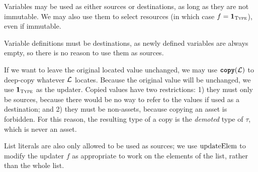 \documentclass[nonacm, dvipsnames, sigconf]{acmart}
\begin{document}
Variables may be used as either sources or destinations, as long as they are not immutable.
We may also use them to select resources (in which case $f = \id{\types}$), even if immutable.
\begin{mathpar}
\end{mathpar}

Variable definitions must be destinations, as newly defined variables are always empty, so there is no reason to use them as sources.
\begin{mathpar}
\end{mathpar}

If we want to leave the original located value unchanged, we may use $\copyC(\Loc)$ to deep-copy whatever $\Loc$ locates.
Because the original value will be unchanged, we use $\id{\types}$ as the updater.
Copied values have two restrictions: 1) they must only be sources, because there would be no way to refer to the values if used as a destination; and 2) they must be non-assets, because copying an asset is forbidden.
For this reason, the resulting type of a copy is the \emph{demoted} type of $\tau$, which is never an asset.
\begin{mathpar}

\end{mathpar}

List literals are also only allowed to be used as sources; we use $\updateElem$ to modify the updater $f$ as appropriate to work on the elements of the list, rather than the whole list.
\begin{mathpar}
\end{mathpar}
\end{document}
